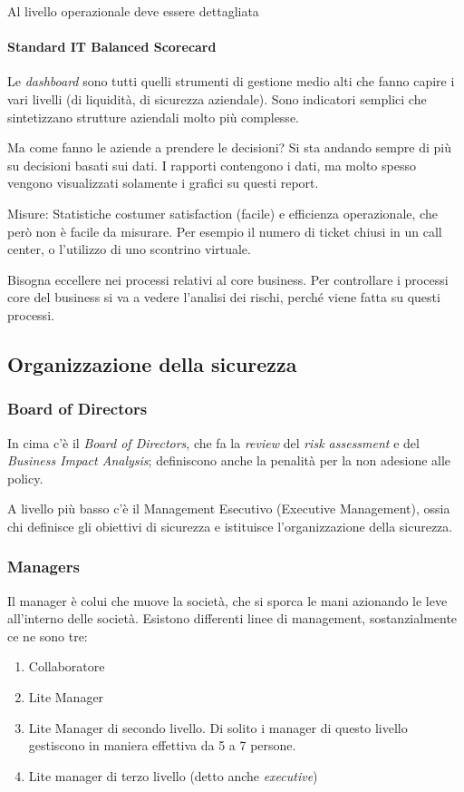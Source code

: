 
Al livello operazionale deve essere dettagliata

\paragraph*{Standard IT Balanced Scorecard} 
Le \textit{dashboard} sono tutti quelli strumenti di gestione medio alti che 
fanno capire i vari livelli (di liquidità, di sicurezza aziendale). Sono 
indicatori semplici che sintetizzano strutture aziendali molto più complesse.

Ma come fanno le aziende a prendere le decisioni? Si sta andando sempre di più 
su decisioni basati sui dati. I rapporti contengono i dati, ma molto spesso 
vengono visualizzati solamente i grafici su questi report.

Misure: Statistiche costumer satisfaction (facile) e efficienza operazionale, 
che però non è facile da misurare. Per esempio il numero di ticket chiusi in un 
call center, o l'utilizzo di uno scontrino virtuale.


Bisogna eccellere nei processi relativi al core business. Per controllare i 
processi core del business si va a vedere l'analisi dei rischi, perché viene 
fatta su questi processi.

\subsection{Organizzazione della sicurezza}

\subsubsection{Board of Directors}
In cima c'è il \textit{Board of Directors}, che fa la \textit{review} del 
\textit{risk assessment} e del \textit{Business Impact Analysis}; definiscono 
anche la penalità per la non adesione alle policy.

A livello più basso c'è il Management Esecutivo (Executive Management), ossia 
chi definisce gli obiettivi di sicurezza e istituisce l'organizzazione della 
sicurezza.

\subsubsection{Managers}
Il manager è colui che muove la società, che si sporca le mani azionando le leve 
all'interno delle società.
Esistono differenti linee di management, sostanzialmente ce ne sono tre:
\begin{enumerate}
\item Collaboratore
\item Lite Manager
\item Lite Manager di secondo livello. Di solito i manager di questo livello 
gestiscono in maniera effettiva da 5 a 7 persone.
\item Lite manager di terzo livello (detto anche \textit{executive})
\end{enumerate}

